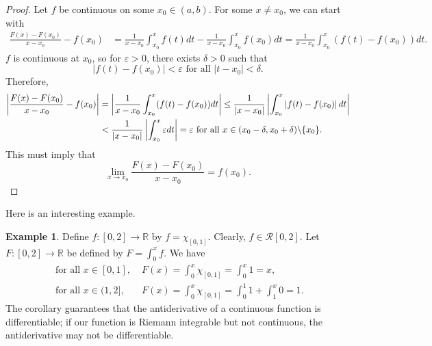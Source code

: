 \documentclass[15pt,a4paper]{book}
\theoremstyle{definition}
\newtheorem{example}[theorem]{Example}
\newcommand{\abs}[1]{\left| #1 \right|} %
\newcommand{\R}{\mathbb{R}} %
\newcommand{\cR}{\mathcal{R}}
\begin{document}
\begin{enumerate}
\begin{proof}
    Let $f$ be continuous on some $x_{0} \in (a,b)$. For some $x \neq x_{0}$, we can start with
    \begin{align}
        \frac{F(x)-F(x_{0})}{x-x_{0}} - f(x_{0}) &= \frac{1}{x-x_{0}} \int_{x_{0}}^{x} f(t) dt - \frac{1}{x-x_{0}} \int_{x_{0}}^{x} f(x_{0}) dt = \frac{1}{x-x_{0}} \int_{x_{0}}^{x} (f(t)-f(x_{0}))dt.
    \end{align}
    $f$ is continuous at $x_{0}$, so for $\varepsilon > 0$, there exists $\delta > 0$ such that
    \begin{equation*}
        \abs{f(t)-f(x_{0})} < \varepsilon \text{ for all } \abs{t-x_{0}} < \delta.
    \end{equation*}
    Therefore,
    \begin{align}
        \abs{\frac{F(x)-F(x_{0})}{x-x_{0}} - f(x_{0})} &= \abs{\frac{1}{x-x_{0}} \int_{x_{0}}^{x} (f(t)-f(x_{0}))dt} \leq \frac{1}{\abs{x-x_{0}}} \abs{\int_{x_{0}}^{x} \abs{f(t)-f(x_{0})}dt} \notag \\
        &< \frac{1}{\abs{x-x_{0}}} \abs{\int_{x_{0}}^{x} \varepsilon dt} = \varepsilon \text{ for all } x \in (x_{0}-\delta,x_{0}+\delta) \backslash \{x_{0}\}.
    \end{align}
    This must imply that
    \begin{equation}
        \lim_{x \to x_{0}} \frac{F(x)-F(x_{0})}{x-x_{0}} = f(x_{0}).
    \end{equation}
\end{proof}
Here is an interesting example.
\begin{example}
    Define $f:[0,2] \to \R$ by $f = \chi_{[0,1]}$. Clearly, $f \in \cR[0,2]$. Let $F:[0,2] \to \R$ be defined by $F = \int_{0}^{x} f$. We have
    \begin{align*}
        \text{ for all } x \in [0,1], &\; F(x) = \int_{0}^{x} \chi_{[0,1]} = \int_{0}^{x} 1 = x,\\
        \text{ for all } x \in (1,2], &\; F(x) = \int_{0}^{x} \chi_{[0,1]} = \int_{0}^{1} 1 + \int_{1}^{x} 0 = 1. 
    \end{align*}
    The corollary guarantees that the antiderivative of a continuous function is differentiable; if our function is Riemann integrable but not continuous, the antiderivative may not be differentiable.
\end{example}


\end{enumerate}
\end{document}
